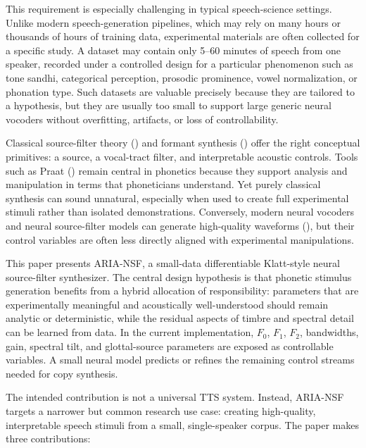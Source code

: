 This requirement is especially challenging in typical speech-science
settings. Unlike modern speech-generation pipelines, which may rely on
many hours or thousands of hours of training data, experimental
materials are often collected for a specific study. A dataset may
contain only 5--60 minutes of speech from one speaker, recorded under a
controlled design for a particular phenomenon such as tone sandhi,
categorical perception, prosodic prominence, vowel normalization, or
phonation type. Such datasets are valuable precisely because they are
tailored to a hypothesis, but they are usually too small to support
large generic neural vocoders without overfitting, artifacts, or loss of
controllability.

Classical source-filter theory () and formant synthesis () offer the right conceptual primitives: a source, a vocal-tract
filter, and interpretable acoustic controls. Tools such as Praat
() remain central in
phonetics because they support analysis and manipulation in terms that
phoneticians understand. Yet purely classical synthesis can sound
unnatural, especially when used to create full experimental stimuli
rather than isolated demonstrations. Conversely, modern neural vocoders
and neural source-filter models can generate high-quality waveforms
(), but their control
variables are often less directly aligned with experimental
manipulations.

This paper presents ARIA-NSF, a small-data differentiable Klatt-style
neural source-filter synthesizer. The central design hypothesis is that
phonetic stimulus generation benefits from a hybrid allocation of
responsibility: parameters that are experimentally meaningful and
acoustically well-understood should remain analytic or deterministic,
while the residual aspects of timbre and spectral detail can be learned
from data. In the current implementation, \(F_0\), \(F_1\), \(F_2\),
bandwidths, gain, spectral tilt, and glottal-source parameters are
exposed as controllable variables. A small neural model predicts or
refines the remaining control streams needed for copy synthesis.

The intended contribution is not a universal TTS system. Instead,
ARIA-NSF targets a narrower but common research use case: creating
high-quality, interpretable speech stimuli from a small, single-speaker
corpus. The paper makes three contributions:

